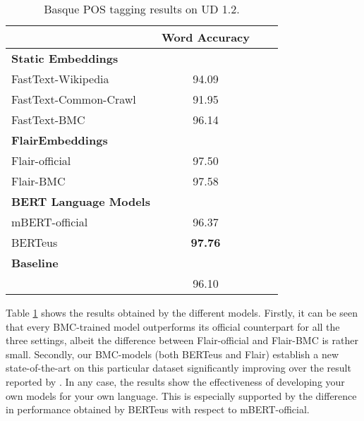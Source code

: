 \documentclass[10pt, a4paper]{article}
\begin{document}
\begin{table}[!ht]\footnotesize
\centering
\begin{tabular}{@{\hspace{0.3cm}}lccc} \hline
 \textbf{} & \textbf{Word Accuracy} \\ \hline
\textbf{Static Embeddings} & \\
FastText-Wikipedia & 94.09 \\
FastText-Common-Crawl & 91.95 \\
FastText-BMC  & 96.14 \\ \hline
\textbf{FlairEmbeddings} \\
Flair-official & 97.50 \\
Flair-BMC  &  97.58 \\ \hline
\textbf{BERT Language Models}\\
mBERT-official &  96.37 \\
BERTeus & \textbf{97.76} \\ \hline
\textbf{Baseline} \\
\cite{heinzerling-strube-2019-sequence} & 96.10 \\ \hline
\end{tabular}
\caption{Basque POS tagging results on UD 1.2.}\label{tab:pos}
\end{table}

Table \ref{tab:pos} shows the results obtained by the different models. Firstly, it can be seen that every BMC-trained model outperforms its official counterpart for all the three settings, albeit the difference between Flair-official and Flair-BMC is rather small. Secondly, our BMC-models (both BERTeus and Flair) establish a new state-of-the-art on this particular dataset significantly improving over the result reported by \cite{heinzerling-strube-2019-sequence}. In any case, the results show the effectiveness of developing your own models for your own language. This is especially supported by the difference in performance obtained by BERTeus with respect to mBERT-official.
\end{document}
